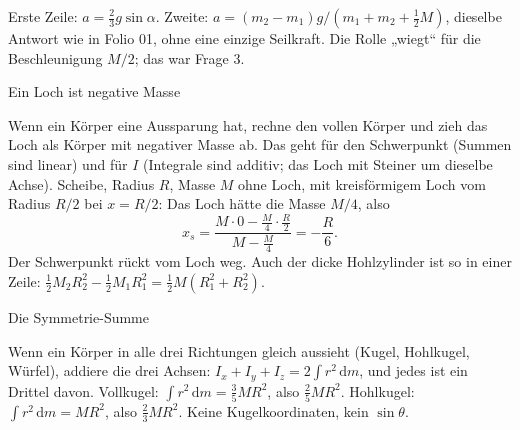 \documentclass[deutsch]{kaelearn}
\newcommand\dd{\mathrm{d}}
\newcommand\trick[2]{\par\medskip\needspace{5\baselineskip}\noindent{\tek\fontsize{11}{11}\selectfont\color{klhi}#1}\hspace{8pt}%
  {\fell\fontsize{13.5}{16}\selectfont\color{klhi}#2}\par\nopagebreak\smallskip\noindent\ignorespaces}
\begin{document}
Erste Zeile: $a = \frac23g\sin\alpha$. Zweite: $a = (m_2-m_1)g/(m_1+m_2+\frac12M)$, dieselbe Antwort wie in Folio 01, ohne eine einzige
Seilkraft. Die Rolle „wiegt“ für die Beschleunigung $M/2$; das war Frage 3.


\trick{04}{Ein Loch ist negative Masse}
Wenn ein Körper eine Aussparung hat, rechne den vollen Körper und zieh das Loch als Körper mit negativer Masse ab. Das geht für den
Schwerpunkt (Summen sind linear) und für $I$ (Integrale sind additiv; das Loch mit Steiner um dieselbe Achse). Scheibe, Radius $R$, Masse $M$
ohne Loch, mit kreisförmigem Loch vom Radius $R/2$ bei $x = R/2$: Das Loch hätte die Masse $M/4$, also
\[
  x_s = \frac{M\cdot0 - \frac M4\cdot\frac R2}{M - \frac M4} = -\frac R6 .
\]
Der Schwerpunkt rückt vom Loch weg. Auch der dicke Hohlzylinder ist so in einer Zeile: $\frac12M_2R_2^2 - \frac12M_1R_1^2 = \frac12M(R_1^2+R_2^2)$.

\begin{center}
\end{center}

\trick{05}{Die Symmetrie-Summe}
Wenn ein Körper in alle drei Richtungen gleich aussieht (Kugel, Hohlkugel, Würfel), addiere die drei Achsen:
$I_x+I_y+I_z = 2\int r^2\,\dd m$, und jedes ist ein Drittel davon. Vollkugel: $\int r^2\,\dd m = \frac35MR^2$, also $\frac25MR^2$. Hohlkugel:
$\int r^2\,\dd m = MR^2$, also $\frac23MR^2$. Keine Kugelkoordinaten, kein $\sin\theta$.
\end{document}

